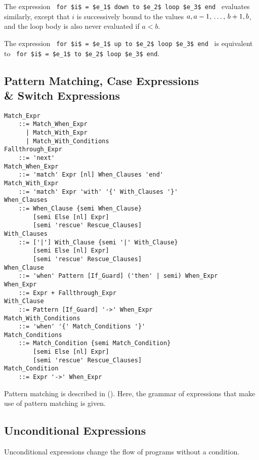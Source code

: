 The expression ~\lstinline!for $i$ = $e_1$ down to $e_2$ loop $e_3$ end!~ evaluates similarly, except that $i$ is successively bound to the values $a, a-1 ,\, \ldots ,\, b+1, b$, and the loop body is also never evaluated if $a < b$. 

The expression ~\lstinline!for $i$ = $e_1$ up to $e_2$ loop $e_3$ end!~ is equivalent to ~\lstinline!for $i$ = $e_1$ to $e_2$ loop $e_3$ end!. 





\subsection[Pattern Matching, Case Expressions \& Switch Expressions]{Pattern Matching, Case Expressions \\\& Switch Expressions}
\label{sec:case-exprs}


\grammar\begin{lstlisting}
Match_Expr     
    ::= Match_When_Expr
      | Match_With_Expr
      | Match_With_Conditions
Fallthrough_Expr 
    ::= 'next'
Match_When_Expr
    ::= 'match' Expr [nl] When_Clauses 'end'
Match_With_Expr
    ::= 'match' Expr 'with' '{' With_Clauses '}'
When_Clauses
    ::= When_Clause {semi When_Clause} 
        [semi Else [nl] Expr]
        [semi 'rescue' Rescue_Clauses]
With_Clauses
    ::= ['|'] With_Clause {semi '|' With_Clause}
        [semi Else [nl] Expr]
        [semi 'rescue' Rescue_Clauses]
When_Clause 
    ::= 'when' Pattern [If_Guard] ('then' | semi) When_Expr
When_Expr
    ::= Expr + Fallthrough_Expr
With_Clause
    ::= Pattern [If_Guard] '->' When_Expr
Match_With_Conditions
    ::= 'when' '{' Match_Conditions '}'
Match_Conditions
    ::= Match_Condition {semi Match_Condition} 
        [semi Else [nl] Expr]
        [semi 'rescue' Rescue_Clauses]
Match_Condition
    ::= Expr '->' When_Expr
\end{lstlisting}

Pattern matching is described in (). Here, the grammar of expressions that make use of pattern matching is given.





\subsection{Unconditional Expressions}

Unconditional expressions change the flow of programs without a condition. 






